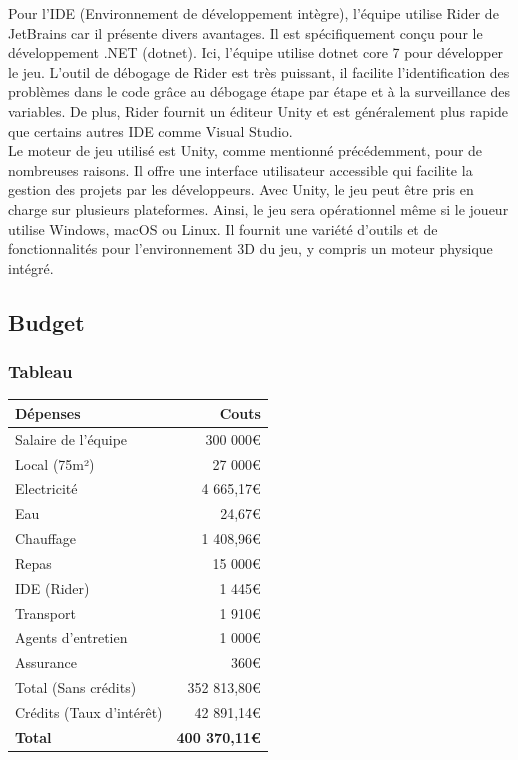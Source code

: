 \documentclass{article}
\begin{document}
Pour l’IDE (Environnement de développement intègre), l’équipe utilise Rider de JetBrains car il présente divers avantages. Il est spécifiquement conçu pour le développement .NET (dotnet). Ici, l'équipe utilise dotnet core 7 pour développer le jeu. L'outil de débogage de Rider est très puissant, il facilite l'identification des problèmes dans le code grâce au débogage étape par étape et à la surveillance des variables. De plus, Rider fournit un éditeur Unity et est généralement plus rapide que certains autres IDE comme Visual Studio.\\

Le moteur de jeu utilisé est Unity, comme mentionné précédemment, pour de nombreuses raisons. Il offre une interface utilisateur accessible qui facilite la gestion des projets par les développeurs. Avec Unity, le jeu peut être pris en charge sur plusieurs plateformes. Ainsi, le jeu sera opérationnel même si le joueur utilise Windows, macOS ou Linux. Il fournit une variété d'outils et de fonctionnalités pour l'environnement 3D du jeu, y compris un moteur physique intégré.





\newpage
\subsection{Budget}
\subsubsection{Tableau}
\begin{longtable}{|>{\columncolor{lightgray}}l|r|}
    \hline
    \rowcolor{lightgray}
    \textbf{Dépenses} & \textbf{Couts}\\ 
    \hline
    Salaire de l'équipe & 300 000€\\ 
    \hline
    Local (75m²) & 27 000€\\ 
    \hline
    Electricité & 4 665,17€\\
    \hline
    Eau & 24,67€\\
    \hline
    Chauffage & 1 408,96€\\
    \hline
    Repas & 15 000€\\
    \hline
    IDE (Rider) & 1 445€\\
    \hline
    Transport & 1 910€\\
    \hline
    Agents d'entretien & 1 000€\\
    \hline
    Assurance & 360€\\
    \hline
    Total (Sans crédits) & 352 813,80€\\
    \hline
    Crédits (Taux d'intérêt) & 42 891,14€\\
    \hline
    \textbf{Total} & \textbf{400 370,11€}\\
    \hline
\end{longtable}
\end{document}
